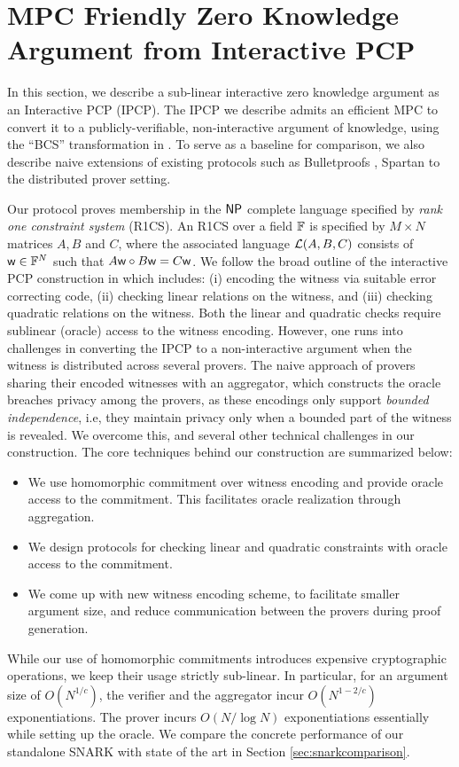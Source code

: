 \section{MPC Friendly Zero Knowledge Argument from Interactive PCP}
In this section, we describe a sub-linear interactive zero knowledge argument as
an Interactive PCP (IPCP). The IPCP we describe admits an efficient MPC to
convert it to a publicly-verifiable, non-interactive argument of knowledge,
using the ``BCS'' transformation in \cite{BCS16}. To serve as a
baseline for comparison, we also describe naive extensions of existing protocols
such as Bulletproofs \cite{bulletproofs}, Spartan \cite{spartan} to the
distributed prover setting. 

Our protocol proves membership in the $\mathsf{NP}$ complete
language specified by {\em rank one constraint system} (R1CS). An R1CS over a
field $\mathbb{F}$ is specified by $M\times N$ matrices $A,B$ and $C$, where the
associated language $\mathcal{L}(A,B,C)$ consists of $\mathsf{w}\in \mathbb{F}^N$ such that
$A\mathsf{w}\circ B\mathsf{w}=C\mathsf{w}$. We follow the broad outline of the interactive PCP
construction in \cite{ligero} which includes: (i) encoding the witness via suitable
error correcting code, (ii) checking linear relations on the witness, and 
(iii) checking quadratic relations on
the witness. Both the linear and quadratic checks require sublinear (oracle) access to the 
witness encoding.
However, one runs into 
challenges in converting the IPCP to a non-interactive
argument when the witness is distributed across several provers. The naive
approach of provers sharing their encoded witnesses with an aggregator, which
constructs the oracle breaches privacy among the provers, as these encodings
only support {\em bounded independence}, i.e, they maintain privacy only when a
bounded part of the witness is revealed. We overcome this, and several other
technical challenges in our construction. The core techniques behind our
construction are summarized below:
\begin{itemize}
\item We use homomorphic commitment over witness encoding and provide oracle
access to the commitment. This facilitates oracle realization through
aggregation.
\item We design protocols for checking linear and quadratic constraints
with oracle access to the commitment.
\item We come up with new witness encoding scheme, to facilitate smaller
argument size, and reduce communication between the provers during proof
generation.
\end{itemize}
While our use of homomorphic commitments introduces expensive cryptographic
operations, we keep their usage strictly sub-linear. In particular, for an
argument size of $O(N^{1/c})$, the verifier and the aggregator incur $O(N^{1-2/c})$
exponentiations. The prover incurs $O(N/\log N)$ exponentiations essentially while
setting up the oracle. We compare the concrete performance of our standalone SNARK with state of the art in Section
\ref{sec:snarkcomparison}.
